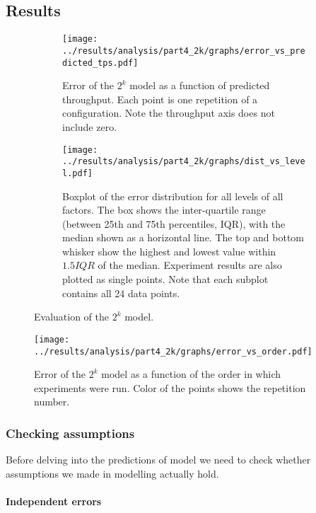 \documentclass[11pt]{article}
\begin{document}
\subsection{Results}

\begin{figure}[h]
\centering
\begin{subfigure}[t]{0.49\textwidth}
\centering
\texttt{[image: ../results/analysis/part4\_2k/graphs/error\_vs\_predicted\_tps.pdf]}
\caption{Error of the $2^k$ model as a function of predicted throughput. Each point is one repetition of a configuration. Note the throughput axis does not include zero.}
\label{fig:part4:errorvspredicted}
\end{subfigure}
\begin{subfigure}[t]{0.49\textwidth}
\centering
\texttt{[image: ../results/analysis/part4\_2k/graphs/dist\_vs\_level.pdf]}
\caption{Boxplot of the error distribution for all levels of all factors. The box shows the inter-quartile range (between 25th and 75th percentiles, IQR), with the median shown as a horizontal line. The top and bottom whisker show the highest and lowest value within $1.5 IQR$ of the median. Experiment results are also plotted as single points. Note that each subplot contains all 24 data points.}
\label{fig:part4:errordistvslevel}
\end{subfigure}
\caption{Evaluation of the $2^k$ model.}
\end{figure}


\begin{figure}[h]
\centering
\texttt{[image: ../results/analysis/part4\_2k/graphs/error\_vs\_order.pdf]}
\caption{Error of the $2^k$ model as a function of the order in which experiments were run. Color of the points shows the repetition number.}
\label{fig:part4:errorvsorder}
\end{figure}


\subsubsection{Checking assumptions}

Before delving into the predictions of model we need to check whether assumptions we made in modelling actually hold.

\paragraph{Independent errors}
\end{document}
